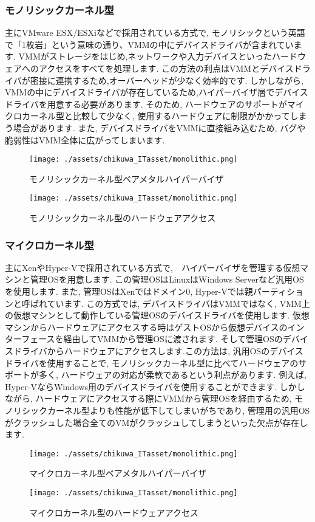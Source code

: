 \subsubsection{モノリシックカーネル型}
主にVMware ESX/ESXiなどで採用されている方式で, モノリシックという英語で「1枚岩」という意味の通り、VMMの中にデバイスドライバが含まれています. VMMがストレージをはじめ,ネットワークや入力デバイスといったハードウェアへのアクセスをすべてを処理します. この方法の利点はVMMとデバイスドライバが密接に連携するため,オーバーヘッドが少なく効率的です. しかしながら, VMMの中にデバイスドライバが存在しているため,ハイパーバイザ層でデバイスドライバを用意する必要があります. そのため, ハードウェアのサポートがマイクロカーネル型と比較して少なく, 使用するハードウェアに制限がかかってしまう場合があります. また, デバイスドライバをVMMに直接組み込むため, バグや脆弱性はVMM全体に広がってしまいます.
\begin{figure}[htbp]
    \centering
    \texttt{[image: ./assets/chikuwa\_ITasset/monolithic.png]}
    \caption{モノリシックカーネル型ベアメタルハイパーバイザ}
    \label{fig:one}
\end{figure}
\begin{figure}[htbp]
    \centering
    \texttt{[image: ./assets/chikuwa\_ITasset/monolithic.png]}
    \caption{モノリシックカーネル型のハードウェアアクセス}
    \label{fig:two}
\end{figure}
\subsubsection{マイクロカーネル型}
主にXenやHyper-Vで採用されている方式で,　ハイパーバイザを管理する仮想マシンと管理OSを用意します. この管理OSはLinuxはWindows Serverなど汎用OSを使用します. また, 管理OSはXenではドメイン0, Hyper-Vでは親パーティションと呼ばれています. この方式では, デバイスドライバはVMMではなく, VMM上の仮想マシンとして動作している管理OSのデバイスドライバを使用します. 仮想マシンからハードウェアにアクセスする時はゲストOSから仮想デバイスのインターフェースを経由してVMMから管理OSに渡されます. そして管理OSのデバイスドライバからハードウェアにアクセスします.この方法は, 汎用OSのデバイスドライバを使用することで, モノリシックカーネル型に比べてハードウェアのサポートが多く, ハードウェアの対応が柔軟であるという利点があります. 例えば, Hyper-VならWindows用のデバイスドライバを使用することができます. しかしながら, ハードウェアにアクセスする際にVMMから管理OSを経由するため, モノリシックカーネル型よりも性能が低下してしまいがちであり, 管理用の汎用OSがクラッシュした場合全てのVMがクラッシュしてしまうといった欠点が存在します.
\begin{figure}[htbp]
    \centering
    \texttt{[image: ./assets/chikuwa\_ITasset/monolithic.png]}
    \caption{マイクロカーネル型ベアメタルハイパーバイザ}
    \label{fig:one}
\end{figure}
\begin{figure}[htbp]
    \centering
    \texttt{[image: ./assets/chikuwa\_ITasset/monolithic.png]}
    \caption{マイクロカーネル型のハードウェアアクセス}
    \label{fig:two}
\end{figure}

